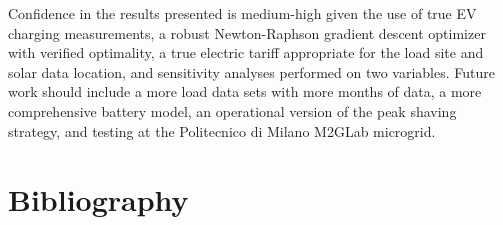 \documentclass[
]{article}
\begin{document}
Confidence in the results presented is medium-high given the use of true
EV charging measurements, a robust Newton-Raphson gradient descent
optimizer with verified optimality, a true electric tariff appropriate
for the load site and solar data location, and sensitivity analyses
performed on two variables. Future work should include a more load data
sets with more months of data, a more comprehensive battery model, an
operational version of the peak shaving strategy, and testing at the
Politecnico di Milano M2GLab microgrid.

\hypertarget{bibliography}{%
  \section{Bibliography}\label{bibliography}}
\end{document}
